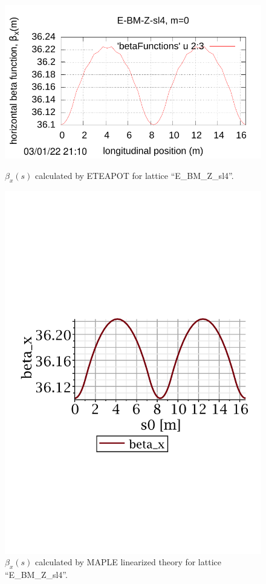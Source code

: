 \documentclass[]{article}
\begin{document}
\begin{figure}[htbp]
\hspace{-0.6cm}
%
\begin{minipage}[b]{0.5\linewidth}
\centering
\includegraphics[scale=0.6]{pdf/Fig_II-5.pdf}
\caption{$\beta_x(s)$ calculated by ETEAPOT 
for lattice ``E\_BM\_Z\_sl4''.}
\label{fig:UAL_Z_betax}
\end{minipage}
%
%
\begin{minipage}[b]{0.49\linewidth}
\centering
\includegraphics[scale=0.45]{pdf/E_BM_Z_2-betax.pdf}
\caption{$\beta_x(s)$ calculated by MAPLE linearized 
theory for lattice ``E\_BM\_Z\_sl4''.}
\label{fig:RT_Z_betax}
\end{minipage}
%
\end{figure}
\end{document}
